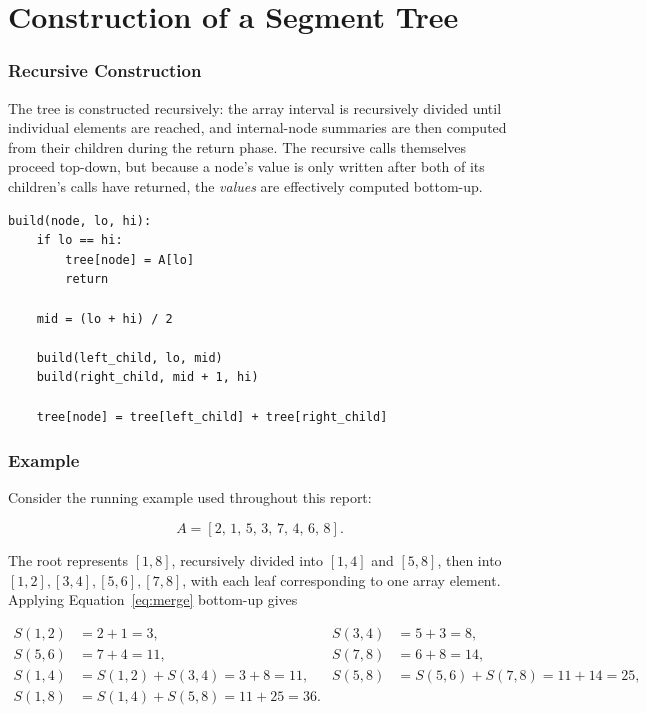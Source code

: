 \documentclass[11pt,open=any,headings=option]{scrreprt}
\begin{document}
\chapter{Construction of a Segment Tree}

\subsection{Recursive Construction}
The tree is constructed recursively: the array interval is recursively divided until individual elements are reached, and internal-node summaries are then computed from their children during the return phase. The recursive calls themselves proceed top-down, but because a node's value is only written after both of its children's calls have returned, the \emph{values} are effectively computed bottom-up.

\begin{lstlisting}
build(node, lo, hi):
    if lo == hi:
        tree[node] = A[lo]
        return

    mid = (lo + hi) / 2

    build(left_child, lo, mid)
    build(right_child, mid + 1, hi)

    tree[node] = tree[left_child] + tree[right_child]
\end{lstlisting}

\subsection{Example}
Consider the running example used throughout this report:

\begin{equation}
A = [2,\,1,\,5,\,3,\,7,\,4,\,6,\,8].
\end{equation}

The root represents $[1,8]$, recursively divided into $[1,4]$ and $[5,8]$, then into $[1,2],[3,4],[5,6],[7,8]$, with each leaf corresponding to one array element. Applying Equation~\eqref{eq:merge} bottom-up gives

\begin{align}
S(1,2) &= 2+1 = 3, & S(3,4) &= 5+3 = 8, \\
S(5,6) &= 7+4 = 11, & S(7,8) &= 6+8 = 14, \\
S(1,4) &= S(1,2)+S(3,4) = 3+8 = 11, & S(5,8) &= S(5,6)+S(7,8) = 11+14 = 25, \\
S(1,8) &= S(1,4)+S(5,8) = 11+25 = 36. &&
\end{align}
\end{document}
